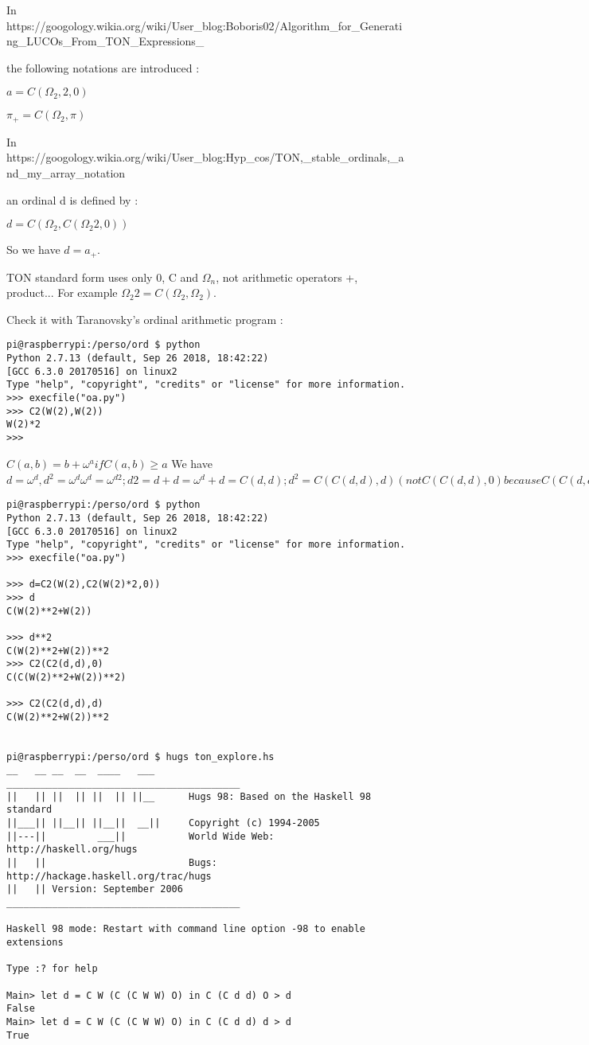 \documentclass[10pt]{article}
\begin{document}
In https://googology.wikia.org/wiki/User\_blog:Boboris02/Algorithm\_for\_Generating\_LUCOs\_From\_TON\_Expressions\_%

the following notations are introduced :

 $a = C(\Omega_2,2,0)$
 
 $\pi_+ = C(\Omega_2,\pi)$
 
In https://googology.wikia.org/wiki/User\_blog:Hyp\_cos/TON,\_stable\_ordinals,\_and\_my\_array\_notation 

an ordinal d is defined by :

 $d = C(\Omega_2,C(\Omega_2 2, 0))$
 
So we have $d = a_+$.

TON standard form uses only 0, C and $\Omega_n$, not arithmetic operators +, product...
For example $\Omega_2 2 = C(\Omega_2,\Omega_2)$.

Check it with Taranovsky's ordinal arithmetic program :

\begin{verbatim}
pi@raspberrypi:/perso/ord $ python
Python 2.7.13 (default, Sep 26 2018, 18:42:22)
[GCC 6.3.0 20170516] on linux2
Type "help", "copyright", "credits" or "license" for more information.
>>> execfile("oa.py")
>>> C2(W(2),W(2))
W(2)*2
>>>
\end{verbatim}

$C(a,b) = b+\omega^a if C(a,b) \ge a$
We have $d = \omega^d, d^2 = \omega^d \omega^d = \omega^{d 2} ; d 2 = d + d = \omega^d + d = C(d,d) ; d^2 = C(C(d,d),d) ( not C(C(d,d),0) because C(C(d,d),0) < d ) ; d^d = C(C(C(d,d),d),d) ; d^{d^d} = C(C(C(C(d,d),d),d),d) ; ... $

\begin{verbatim}
pi@raspberrypi:/perso/ord $ python
Python 2.7.13 (default, Sep 26 2018, 18:42:22)
[GCC 6.3.0 20170516] on linux2
Type "help", "copyright", "credits" or "license" for more information.
>>> execfile("oa.py")

>>> d=C2(W(2),C2(W(2)*2,0))
>>> d
C(W(2)**2+W(2))

>>> d**2
C(W(2)**2+W(2))**2
>>> C2(C2(d,d),0)
C(C(W(2)**2+W(2))**2)

>>> C2(C2(d,d),d)
C(W(2)**2+W(2))**2


pi@raspberrypi:/perso/ord $ hugs ton_explore.hs
__   __ __  __  ____   ___      _________________________________________
||   || ||  || ||  || ||__      Hugs 98: Based on the Haskell 98 standard
||___|| ||__|| ||__||  __||     Copyright (c) 1994-2005
||---||         ___||           World Wide Web: http://haskell.org/hugs
||   ||                         Bugs: http://hackage.haskell.org/trac/hugs
||   || Version: September 2006 _________________________________________

Haskell 98 mode: Restart with command line option -98 to enable extensions

Type :? for help

Main> let d = C W (C (C W W) O) in C (C d d) O > d
False
Main> let d = C W (C (C W W) O) in C (C d d) d > d
True
\end{verbatim}
\end{document}
